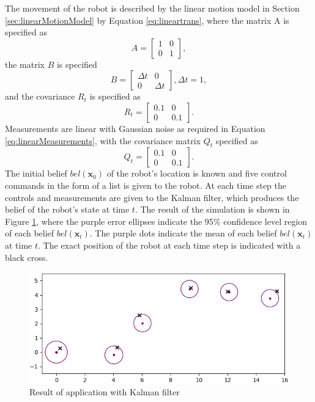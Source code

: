 \documentclass[12pt,oneside,openany,a4paper, %
afrikaans,english,
]{memoir}
\numberwithin{equation}{chapter}
\begin{document}
The movement of the robot is described by the linear motion model in Section \ref{sec:linearMotionModel} by Equation \ref{eq:lineartrans},
where the matrix A is specified as
\begin{equation}
A =
\begin{bmatrix}
1 & 0\\
0 & 1
\end{bmatrix},
\end{equation}
the matrix $B$ is specified
\begin{equation}
B =
\begin{bmatrix}
\Delta t & 0\\
0 & \Delta t
\end{bmatrix}, \Delta t = 1,
\end{equation}
and the covariance $R_t$ is specified as
\begin{equation}
R_t =
\begin{bmatrix}
0.1 & 0\\
0 & 0.1
\end{bmatrix}.
\end{equation}
Measurements are linear with Gaussian noise as required in Equation \ref{eq:linearMeasurements},
with the covariance matrix $Q_t$ specified as
\begin{equation}
Q_t =
\begin{bmatrix}
0.1 & 0\\
0 & 0.1
\end{bmatrix}.
\end{equation}
The initial belief $bel(\bm{x}_0)$ of the robot's location is known and five control commands in the form of a list is given to the robot. At each time step the controls and measurements are given to the Kalman filter, which produces the belief of the robot's state at time $t$. The result of the simulation is shown in Figure \ref{fig:resultKF}, where the purple error ellipses indicate the 95\% confidence level region of each belief $bel(\bm{x}_t)$. The purple dots indicate the mean of each belief $bel(\bm{x}_t)$ at time $t$. The exact position of the robot at each time step is indicated with a black cross.

\begin{figure}[H]

  \includegraphics[width=0.8\linewidth]{Figures/result_kalmanfilter.png}
  \centering
  \caption{Result of application with Kalman filter}
  \label{fig:resultKF}
\end{figure}
\end{document}
